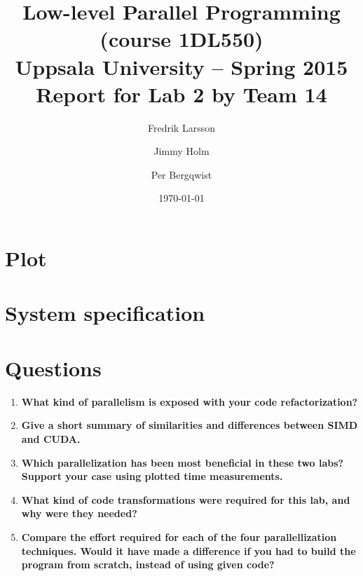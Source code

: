 \documentclass[a4paper,11pt]{article}
\title{\textbf{Low-level Parallel Programming (course 1DL550) \\
    Uppsala University -- Spring 2015 \\
    Report for Lab 2 by Team 14}}
\author{Fredrik Larsson \and Jimmy Holm \and Per Bergqwist}
\date{\today}
\begin{document}
\maketitle
\section{Plot}
\begin{center}
\end{center}

\section{System specification}

\section{Questions}
\begin{enumerate}[label=\Alph*.]
\item \textbf{What kind of parallelism is exposed with your code refactorization?}\\

\item \textbf{Give a short summary of similarities and differences between SIMD and CUDA.}\\

\item \textbf{Which parallelization has been most beneficial in these two labs? Support your case using plotted time measurements.}\\ 

\item \textbf{What kind of code transformations were required for this lab, and why were they needed?}\\

\item \textbf{Compare the effort required for each of the four parallellization techniques. Would it have made a difference if you had to build the program from scratch, instead of using given code?}\\

\end{enumerate}
\end{document}
